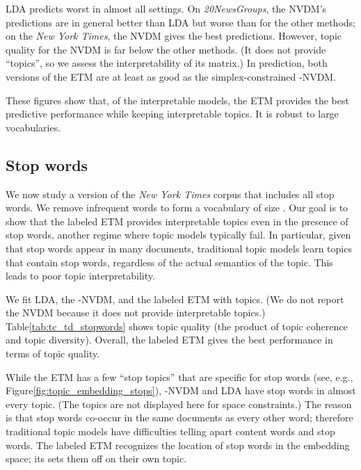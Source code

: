 \documentclass[11pt,a4paper]{article}
\begin{document}
\gls{LDA} predicts worst in almost all settings. On
\emph{20NewsGroups}, the \gls{NVDM}'s predictions are in general
better than \gls{LDA} but worse than for the other methods; on the
\emph{New York Times}, the \gls{NVDM} gives the best
predictions. However, topic quality for the \gls{NVDM} is far below
the other methods.  (It does not provide ``topics'', so we assess the
interpretability of its  matrix.)  In prediction, both versions
of the \gls{ETM} are at least as good as the simplex-constrained
-\gls{NVDM}.

These figures show that, of the interpretable models, the \gls{ETM}
provides the best predictive performance while keeping interpretable
topics.  It is robust to large vocabularies.

\subsection{Stop words}
\label{subsec:experiments_stopwords}

We now study a version of the \emph{New York Times} corpus that
includes all stop words. We remove infrequent words to form a vocabulary
of size .  Our goal is to show that the labeled \gls{ETM}
provides interpretable topics even in the presence of stop words,
another regime where topic models typically fail. In particular, given that
stop words appear in many documents, traditional topic models learn topics
that contain stop words, regardless of the actual semantics of the topic.
This leads to poor topic interpretability.

We fit \gls{LDA}, the -\gls{NVDM}, and the labeled \gls{ETM}
with  topics. (We do not report the \gls{NVDM} because it does
not provide interpretable topics.)  Table\nobreakspace \ref {tab:tc_td_stopwords} shows
topic quality (the product of topic coherence and topic
diversity). Overall, the labeled \gls{ETM} gives the best performance
in terms of topic quality.

While the \gls{ETM} has a few ``stop topics'' that are specific for
stop words (see, e.g., Figure\nobreakspace \ref {fig:topic_embedding_stops}),
-\gls{NVDM} and \gls{LDA} have stop words in almost every
topic.  (The topics are not displayed here for space constraints.) The
reason is that stop words co-occur in the same documents as every
other word; therefore traditional topic models have difficulties
telling apart content words and stop words. The labeled \gls{ETM}
recognizes the location of stop words in the embedding space;
its sets them off on their own topic.
\end{document}
